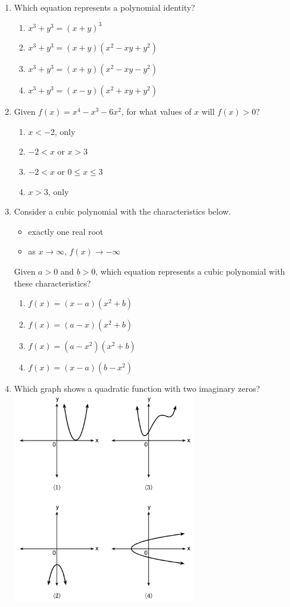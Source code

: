 \documentclass[12pt, twoside]{article}
\begin{document}
\begin{enumerate}[itemsep=0.5cm]
\item Which equation represents a polynomial identity? %
\begin{enumerate}
    \item \(x^3 + y^3 = (x + y)^3\)
    \item \(x^3 + y^3 = (x + y)(x^2 - xy + y^2)\)
    \item \(x^3 + y^3 = (x + y)(x^2 - xy - y^2)\)
    \item \(x^3 + y^3 = (x - y)(x^2 + xy + y^2)\)
\end{enumerate}

\item Given $f(x) = x^4 - x^3 - 6x^2$, for what values of $x$ will $f(x)>0$? %
\begin{enumerate}
    \item $x<-2$, only
    \item $-2<x$ or $x>3$
    \item $-2<x$ or $0 \le x \le 3$
    \item $x>3$, only
\end{enumerate}

\item  Consider a cubic polynomial with the characteristics below. %
\begin{itemize}
\item exactly one real root
\item as $x \rightarrow \infty$, $f(x) \rightarrow -\infty$
\end{itemize}
Given $a>0$ and $b>0$, which equation represents a cubic
polynomial with these characteristics?
\begin{enumerate}
    \item $f(x) = (x - a)(x^2 + b)$
    \item $f(x) = (a - x)(x^2 + b)$
    \item $f(x) = (a - x^2)(x^2 + b)$
    \item $f(x) = (x - a)(b - x^2)$
\end{enumerate}

\item Which graph shows a quadratic function with two imaginary zeros? \\ %
\includegraphics*[width=8cm]{../graphics/regents-jan2023-24-polynomials.png}


\end{enumerate}
\end{document}
